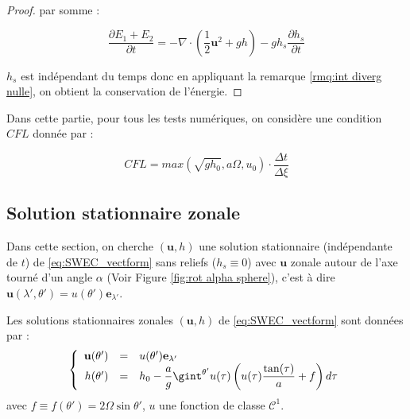 \begin{proof}
par somme :

$$
\dfrac{\partial E_1 + E_2}{\partial t} = - \nabla \cdot \left( \dfrac{1}{2} \mathbf{u}^2 + gh \right) - g h_s \dfrac{\partial h_s}{\partial t} 
$$

$h_s$ est indépendant du temps donc en appliquant la remarque \ref{rmq:int diverg nulle}, on obtient la conservation de l'énergie.
\end{proof}

Dans cette partie, pour tous les tests numériques, on considère une condition $CFL$ donnée par :

\begin{equation}
CFL=max(\sqrt{g h_0}, a \Omega, u_0) \cdot \dfrac{\Delta t}{\Delta \xi}
\end{equation}















\subsection{Solution stationnaire zonale}

Dans cette section, on cherche $(\mathbf{u},h)$ une solution stationnaire (indépendante de $t$) de \eqref{eq:SWEC_vectform} sans reliefs ($h_s \equiv 0$) avec $\mathbf{u}$ zonale autour de l'axe tourné d'un angle $\alpha$ (Voir Figure \ref{fig:rot alpha sphere}), c'est à dire $\mathbf{u}(\lambda', \theta') = u(\theta') \mathbf{e}_{\lambda'}$.

\begin{proposition}
Les solutions stationnaires zonales $(\mathbf{u},h)$ de \eqref{eq:SWEC_vectform} sont données par :
\begin{equation}
\left\lbrace
\begin{array}{rcl}
\mathbf{u}(\theta') & = & u(\theta') \mathbf{e}_{\lambda'}\\
h(\theta') & = & h_0 - \dfrac{a}{g} \gint^{\theta'} u(\tau) \left( u(\tau) \dfrac{\tan (\tau)}{a} + f \right) d\tau\\
\end{array}
\right.
\label{eq:sol. stationaire zonale de swe}
\end{equation}
avec $f \equiv f(\theta') = 2 \Omega \sin \theta'$, $u$ une fonction de classe $\mathcal{C}^1$.
\end{proposition}

